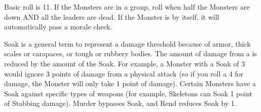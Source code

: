 {\begin{multicols}{2}
{  \item {}  Basic roll is 11.  If the Monsters are in a group, roll when half the Monsters are down AND all the leaders are dead.  If the Monster is by itself, it will automatically pass a morale check.
}









Soak is a general term to represent a damage threshold because of armor, thick scales or carapaces, or tough or rubbery bodies.  The amount of damage from a   is reduced by the amount of the Soak.  For example, a Monster with a Soak of 3 would ignore 3 points of damage from a physical attack (so if you roll a 4 for damage, the Monster will only take 1 point of damage).  Certain Monsters have a Soak against specific types of weapons (for example, Skeletons can Soak 1 point of Stabbing damage).  Murder bypasses Soak, and Rend reduces Soak by 1. 


\end{multicols}}
